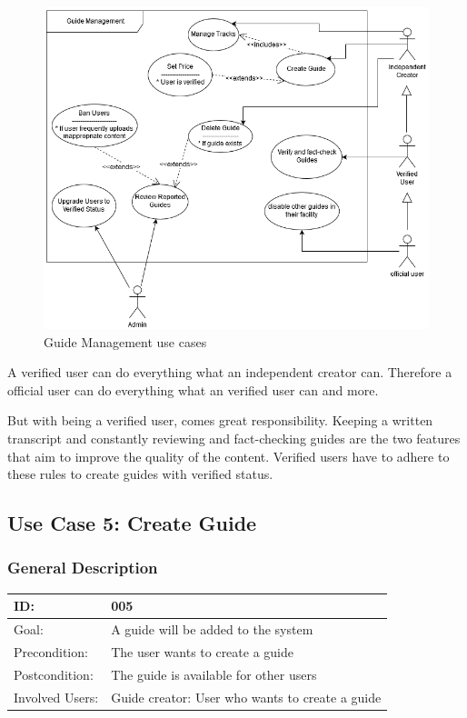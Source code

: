 \documentclass[12pt]{article}
\theoremstyle{definition}
\newenvironment{text}{
   \setlength{\parindent}{0pt}
   \color{black}
}{}
\begin{document}
\begin{figure}[hbt!]
    \includegraphics[width=1\linewidth]{UseCases/ManagementUseCases.png}
    \caption{Guide Management use cases}
    \label{fig:overview2}
\end{figure}
\begin{text}
A verified user can do everything what an independent creator can. Therefore a official user can do everything what an verified user can and more.

But with being a verified user, comes great responsibility. Keeping a written transcript and constantly reviewing and fact-checking guides are the two features that aim to improve the quality of the content. Verified users have to adhere to these rules to create guides with verified status.
\end{text}

\subsection{Use Case 5: Create Guide}
    \subsubsection{General Description}
    
    \begin{tabular}{|p{.2\linewidth}|p{.65\linewidth}|}
    \hline 
    ID: & 005 \\ \hline
    Goal: & A guide will be added to the system \\ \hline
    Precondition: & The user wants to create a guide \\ \hline
    Postcondition: & The guide is available for other users \\ \hline
    Involved Users: & Guide creator: User who wants to create a guide\\ \hline
    \end{tabular}
    
\end{document}
